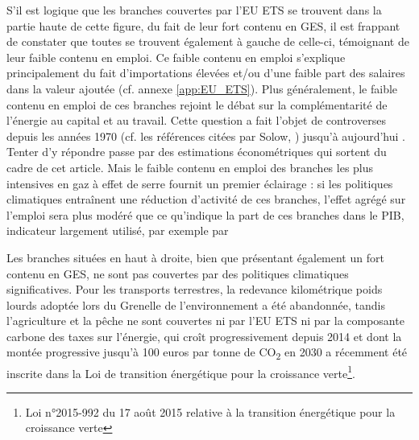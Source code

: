 S’il est logique que les branches couvertes par l'EU ETS se trouvent dans la partie haute de cette figure, du fait de leur fort contenu en GES, il est frappant de constater que toutes se trouvent également à gauche de celle-ci, témoignant de leur faible contenu en emploi. Ce faible contenu en emploi s'explique principalement du fait d'importations élevées et/ou d'une faible part des salaires dans la valeur ajoutée (cf. annexe \ref{app:EU_ETS}).
Plus généralement, le faible contenu en emploi de ces branches rejoint le débat sur la complémentarité de l’énergie au capital et au travail. Cette question a fait l’objet de controverses depuis les années 1970 (cf. les références citées par Solow, \citeyear{Solow1987}) jusqu’à aujourd’hui \citep{Dissou2015, Fiorito2016}. 
Tenter d’y répondre passe par des estimations économétriques qui sortent du cadre de cet article. Mais le faible contenu en emploi des branches les plus intensives en gaz à effet de serre fournit un premier éclairage : si les politiques climatiques entraînent une réduction d’activité de ces branches, l’effet agrégé sur l’emploi sera plus modéré que ce qu’indique la part de ces branches dans le PIB, indicateur largement utilisé, par exemple par \citet{Sato2015}

Les branches situées en haut à droite, bien que présentant également un fort contenu en GES, ne sont pas couvertes par des politiques climatiques significatives. Pour les transports terrestres, la redevance kilométrique poids lourds adoptée lors du Grenelle de l’environnement a été abandonnée, tandis l’agriculture et la pêche ne sont couvertes ni par l'EU ETS ni par la composante carbone des taxes sur l’énergie, qui croît progressivement depuis 2014 et dont la montée progressive jusqu’à 100 euros par tonne de CO\textsubscript{2} en 2030 a récemment été inscrite dans la Loi de transition énergétique pour la croissance verte\footnote{Loi n°2015-992 du 17 août 2015 relative à la transition énergétique pour la croissance verte}.

